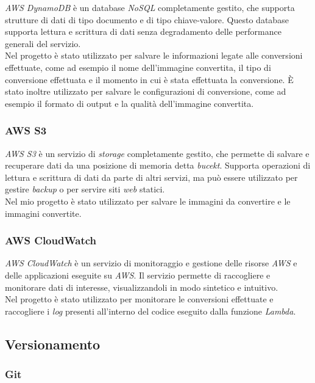 \emph{AWS DynamoDB} è un database \emph{NoSQL} completamente gestito, che
supporta strutture di dati di tipo documento e di tipo chiave-valore. Questo
database supporta lettura e scrittura di dati senza degradamento delle
performance generali del servizio. \\
Nel progetto è stato utilizzato per salvare le informazioni legate alle
conversioni effettuate, come ad esempio il nome dell'immagine convertita, il
tipo di conversione effettuata e il momento in cui è stata effettuata la
conversione. È stato inoltre utilizzato per salvare le configurazioni di
conversione, come ad esempio il formato di output e la qualità dell'immagine
convertita.

\subsubsection*{AWS S3}

\emph{AWS S3} è un servizio di \emph{storage} completamente gestito, che
permette di salvare e recuperare dati da una posizione di memoria detta
\emph{bucekt}. Supporta operazioni di lettura e scrittura di dati da parte di
altri servizi, ma può essere utilizzato per gestire \emph{backup} o per servire
siti \emph{web} statici. \\
Nel mio progetto è stato utilizzato per salvare le immagini da convertire e le
immagini convertite.

\subsubsection*{AWS CloudWatch}

\emph{AWS CloudWatch} è un servizio di monitoraggio e gestione delle risorse
\emph{AWS} e delle applicazioni eseguite su \emph{AWS}. Il servizio permette di
raccogliere e monitorare dati di interesse, visualizzandoli in modo sintetico e
intuitivo. \\
Nel progetto è stato utilizzato per monitorare le conversioni effettuate e
raccogliere i \emph{log} presenti all'interno del codice eseguito dalla funzione
\emph{Lambda}.

\subsection{Versionamento}

\subsubsection*{Git}

